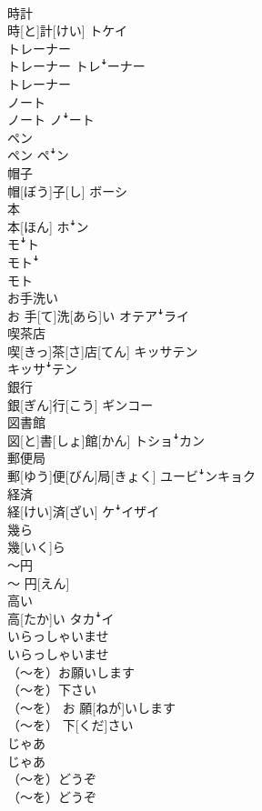 \documentclass[8pt]{extreport}
\begin{document}
\begin{CJK}{UTF8}{min}
\\	時計	
\\	時[と]計[けい]	トケイ
\\	トレーナー	
\\	トレーナー	トレꜜーナー 
\\	トレーナー
\\	ノート	
\\	ノート	ノꜜート
\\	ペン	
\\	ペン	ペꜜン
\\	帽子	
\\	帽[ぼう]子[し]	ボーシ
\\	本	
\\	本[ほん]	ホꜜン 
\\	モꜜト 
\\	モトꜜ 
\\	モト
\\	お手洗い	
\\	お 手[て]洗[あら]い	オテアꜜライ
\\	喫茶店	
\\	喫[きっ]茶[さ]店[てん]	キッサテン 
\\	キッサꜜテン
\\	銀行	
\\	銀[ぎん]行[こう]	ギンコー
\\	図書館	
\\	図[と]書[しょ]館[かん]	トショꜜカン
\\	郵便局	
\\	郵[ゆう]便[びん]局[きょく]	ユービꜜンキョク
\\	経済	
\\	経[けい]済[ざい]	ケꜜイザイ
\\	幾ら	
\\	幾[いく]ら	
\\	〜円	
\\	〜 円[えん]	
\\	高い	
\\	高[たか]い	タカꜜイ
\\	いらっしゃいませ	
\\	いらっしゃいませ	
\\	（〜を）お願いします 
\\	（〜を）下さい	
\\	（〜を） お 願[ねが]いします 
\\	（〜を） 下[くだ]さい	
\\	じゃあ	
\\	じゃあ	
\\	（〜を）どうぞ	
\\	（〜を）どうぞ	

\end{CJK}
\end{document}
